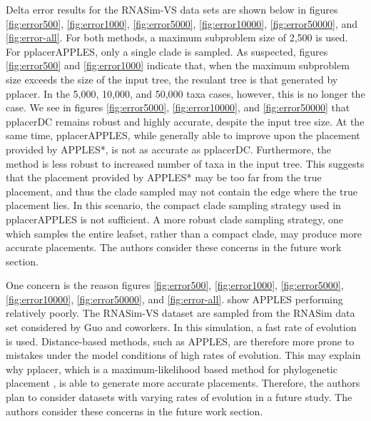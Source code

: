 \documentclass[10pt]{article}
\begin{document}
Delta error results for the RNASim-VS data sets
are shown below in figures
\ref{fig:error500},
\ref{fig:error1000},
\ref{fig:error5000},
\ref{fig:error10000},
\ref{fig:error50000},
and
\ref{fig:error-all}.
For both methods, a maximum subproblem size of 2,500 is used.
For pplacerAPPLES, only a single clade is sampled.
As suspected, figures \ref{fig:error500} and \ref{fig:error1000}
indicate that, when the maximum subproblem size exceeds
the size of the input tree, the resulant tree is that generated by pplacer.
In the 5,000, 10,000, and 50,000 taxa cases, however, this is no longer the case.
We see in figures \ref{fig:error5000}, \ref{fig:error10000}, and \ref{fig:error50000}
that pplacerDC remains robust and highly accurate, despite the input tree size.
At the same time, pplacerAPPLES, while generally able to improve upon the
placement provided by APPLES*, is not as accurate as pplacerDC.
Furthermore, the method is less robust to increased number of taxa in the input tree.
This suggests that the placement provided by APPLES* may
be too far from the true placement, and thus the clade sampled may not contain
the edge where the true placement lies.
In this scenario, the compact clade sampling strategy used in pplacerAPPLES
is not sufficient.
A more robust clade sampling strategy, one which samples the entire leafset,
rather than a compact clade, may produce more accurate placements.
The authors consider these concerns in the future work section.

One concern is the reason figures
\ref{fig:error500},
\ref{fig:error1000},
\ref{fig:error5000},
\ref{fig:error10000},
\ref{fig:error50000},
and
\ref{fig:error-all}.
show APPLES performing relatively poorly.
The RNASim-VS dataset are sampled from the RNASim data set considered by Guo and coworkers\cite{guo}.
In this simulation, a fast rate of evolution is used.
Distance-based methods, such as APPLES, are therefore more prone to mistakes
under the model conditions of high rates of evolution.
This may explain why pplacer, which is a maximum-likelihood based method for phylogenetic placement \cite{matsen_pplacer_2010},
is able to generate more accurate placements.
Therefore, the authors plan to consider datasets with varying rates of evolution in a future study.
The authors consider these concerns in the future work section.
\end{document}
